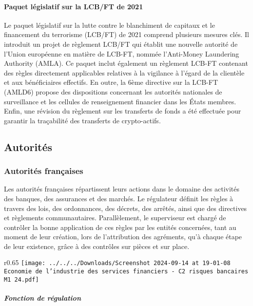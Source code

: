 \documentclass[a4paper, 12pt]{report}
\begin{document}
\paragraph{Paquet législatif sur la LCB/FT de 2021}

Le paquet législatif sur la lutte contre le blanchiment de capitaux et le financement du terrorisme (LCB/FT) de 2021 comprend plusieurs mesures clés. Il introduit un projet de règlement LCB/FT qui établit une nouvelle autorité de l'Union européenne en matière de LCB-FT, nommée l'Anti-Money Laundering Authority (AMLA). Ce paquet inclut également un règlement LCB-FT contenant des règles directement applicables relatives à la vigilance à l'égard de la clientèle et aux bénéficiaires effectifs. En outre, la 6ème directive sur la LCB-FT (AMLD6) propose des dispositions concernant les autorités nationales de surveillance et les cellules de renseignement financier dans les États membres. Enfin, une révision du règlement sur les transferts de fonds a été effectuée pour garantir la traçabilité des transferts de crypto-actifs.

\subsection{Autorités}

\subsubsection{Autorités françaises}

Les autorités françaises répartissent leurs actions dans le domaine des activités des banques, des assurances et des marchés. Le régulateur définit les règles à travers des lois, des ordonnances, des décrets, des arrêtés, ainsi que des directives et règlements communautaires. Parallèlement, le superviseur est chargé de contrôler la bonne application de ces règles par les entités concernées, tant au moment de leur création, lors de l'attribution des agréments, qu'à chaque étape de leur existence, grâce à des contrôles sur pièces et sur place.

\begin{wrapfigure}{r}{0.65\textwidth}
	\centering
	\texttt{[image: ../../../Downloads/Screenshot 2024-09-14 at 19-01-08 Economie de l’industrie des services financiers - C2 risques bancaires M1 24.pdf]}
\end{wrapfigure}

\subparagraph{Fonction de régulation}
\end{document}
